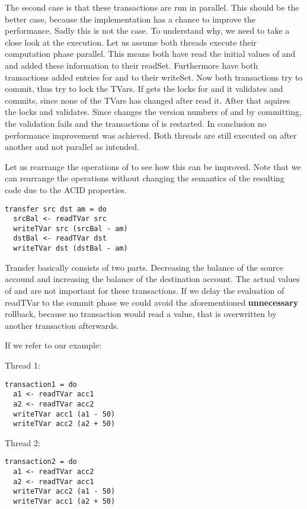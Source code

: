 The second case is that these transactions are run in parallel. This should be the better case, because the implementation
has a chance to improve the performance. Sadly this is not the case. To understand why, we need to take a close look at 
the execution. Let us assume both threads execute their computation phase parallel. This means both have read the initial 
values of  and  and added these information to their readSet. Furthermore have both transactions 
added entries for  and  to their writeSet. Now both transactions try to commit, thus try to lock 
the TVars. If  gets the locks for  and  it validates and commits, since none of 
the TVars has changed after  read it. After that  aquires the locks and validates.
Since  changes the version numbers of  and  by committing, the validation fails
and the transactions of  is restarted. 
In conclusion no performance improvement was achieved. Both threads are still executed 
on after another and not parallel as intended.

Let us rearrange the operations of  to see how this can be improved. Note that we can rearrange the 
operations without changing the semantics of the resulting code due to the ACID properties. 
\begin{lstlisting}
transfer src dst am = do 
  srcBal <- readTVar src
  writeTVar src (srcBal - am)
  dstBal <- readTVar dst
  writeTVar dst (dstBal - am)
\end{lstlisting}
Transfer basically consists of two parts. Decreasing the balance of the source accound and increasing the 
balance of the destination account. The actual values of  and  are not important for
these transactions. If we delay the evaluation of readTVar to the commit phase we could avoid the 
aforementioned \textbf{unnecessary} rollback, because no transaction would read a value, that is overwritten
by another transaction afterwards. 

If we refer to our example: 
\par\noindent
\begin{minipage}[t]{.45\textwidth}
Thread 1:
\begin{lstlisting}[frame=lrtb]
transaction1 = do
  a1 <- readTVar acc1
  a2 <- readTVar acc2
  writeTVar acc1 (a1 - 50)
  writeTVar acc2 (a2 + 50)
\end{lstlisting}
\end{minipage}
\hfill
\begin{minipage}[t]{.45\textwidth}
Thread 2:
\begin{lstlisting}[frame=lrtb]
transaction2 = do 
  a1 <- readTVar acc2
  a2 <- readTVar acc1
  writeTVar acc2 (a1 - 50)
  writeTVar acc1 (a2 + 50)
\end{lstlisting}
\end{minipage}


